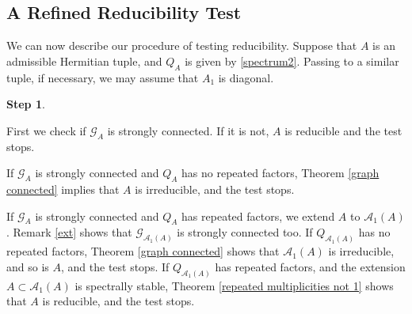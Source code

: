 \documentclass[draft, 12pt, reqno]{amsart}
\numberwithin{equation}{section}
\theoremstyle{plain}
\begin{document}
\subsection{A Refined Reducibility Test}


\vspace{.2cm}




We can now describe our procedure of testing reducibility. Suppose that $A$ is an admissible Hermitian tuple, and $Q_A$ is given by \eqref{spectrum2}. Passing to a similar tuple, if necessary, we may assume that $A_1$ is diagonal. 

\vspace{.2cm}

\textbf{Step 1}.

\vspace{.2cm}

First we check if $\mathcal{G}_A$ is strongly connected. If it is not, $A$ is reducible and  the test stops. 

If $\mathcal{G}_A$ is strongly connected and $Q_A$ has no repeated factors, Theorem \ref{graph connected} implies that $A$ is irreducible, and the test stops. 

If $\mathcal{G}_A$ is strongly connected and $Q_A$ has  repeated factors, we extend $A$ to $\mathcal{A}_1(A)$. Remark \ref{ext} shows that $\mathcal{G}_{\mathcal{A}_1(A)}$ is strongly connected too. If $Q_{\mathcal{A}_1(A)}$ has no repeated factors, Theorem \ref{graph connected} shows that $\mathcal{A}_1(A)$ is irreducible, and so is $A$, and the test stops. If $Q_{\mathcal{A}_1(A)}$ has repeated factors, and the extension $A\subset \mathcal{A}_1(A)$ is spectrally stable, Theorem \ref{repeated multiplicities not 1} shows that $A$ is reducible, and the test stops.
\end{document}
